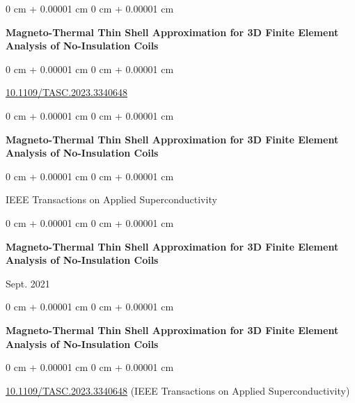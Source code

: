 \documentclass[10pt, letterpaper]{article}
\newenvironment{onecolentry}{
    \begin{adjustwidth}{
        0 cm + 0.00001 cm
    }{
        0 cm + 0.00001 cm
    }
}{
    \end{adjustwidth}
} %
\newenvironment{twocolentry}[2][]{
    \onecolentry
    \def\secondColumn{#2}
    \setcolumnwidth{\fill, 4.5 cm}
    \begin{paracol}{2}
}{
    \switchcolumn \raggedleft \secondColumn
    \end{paracol}
    \endonecolentry
} %
\begin{document}
        \vspace{0.2 cm}

        \begin{samepage}
            \begin{onecolentry}
                \textbf{Magneto-Thermal Thin Shell Approximation for 3D Finite Element Analysis of No-Insulation Coils}
            \end{onecolentry}


            \vspace{0.10 cm}

            \begin{onecolentry}
        \href{https://doi.org/10.1109/TASC.2023.3340648}{10.1109/TASC.2023.3340648}    \end{onecolentry}
        \end{samepage}

        \vspace{0.2 cm}

        \begin{samepage}
            \begin{onecolentry}
                \textbf{Magneto-Thermal Thin Shell Approximation for 3D Finite Element Analysis of No-Insulation Coils}
            \end{onecolentry}


            \vspace{0.10 cm}

            \begin{onecolentry}
        IEEE Transactions on Applied Superconductivity    \end{onecolentry}
        \end{samepage}

        \vspace{0.2 cm}

        \begin{samepage}
            \begin{twocolentry}{
                Sept. 2021
            }
                \textbf{Magneto-Thermal Thin Shell Approximation for 3D Finite Element Analysis of No-Insulation Coils}
            \end{twocolentry}


        \end{samepage}

        \vspace{0.2 cm}

        \begin{samepage}
            \begin{onecolentry}
                \textbf{Magneto-Thermal Thin Shell Approximation for 3D Finite Element Analysis of No-Insulation Coils}
            \end{onecolentry}


            \vspace{0.10 cm}

            \begin{onecolentry}
        \href{https://doi.org/10.1109/TASC.2023.3340648}{10.1109/TASC.2023.3340648} (IEEE Transactions on Applied Superconductivity)    \end{onecolentry}
        \end{samepage}
\end{document}
